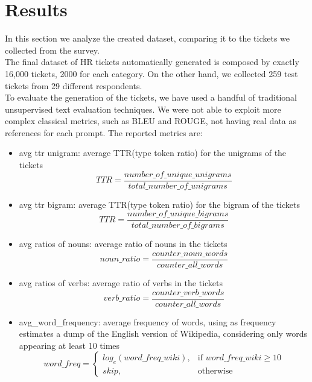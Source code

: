 \section{Results}
In this section we analyze the created dataset, comparing it to the tickets we collected from the survey. \\
The final dataset of HR tickets automatically generated is composed by exactly 16,000 tickets, 2000 for each category. On the other hand, we collected 259 test tickets from 29 different respondents. \\
To evaluate the generation of the tickets, we have used a handful of traditional unsupervised text evaluation techniques. We were not able to exploit more complex classical metrics, such as BLEU and ROUGE, not having real data as references for each prompt.
The reported metrics are:
\begin{itemize}
    \item avg ttr unigram: average TTR(type token ratio) for the unigrams of the tickets\\ 
    \begin{equation*}
        TTR = \frac{number\_of\_unique\_unigrams}{total\_number\_of\_unigrams}
    \end{equation*}
    \item avg ttr bigram: average TTR(type token ratio) for the bigram of the tickets\\ 
    \begin{equation*}
        TTR = \frac{number\_of\_unique\_bigrams}{total\_number\_of\_bigrams}
    \end{equation*}
    \item avg ratios of nouns: average ratio of nouns in the tickets\\
    \begin{equation*}
        noun\_ratio = \frac{counter\_noun\_words}{counter\_all\_words}
    \end{equation*}
    \item avg ratios of verbs: average ratio of verbs in the tickets\\
    \begin{equation*}
        verb\_ratio = \frac{counter\_verb\_words}{counter\_all\_words}
    \end{equation*}
    \item avg\_word\_frequency: average frequency of words, using as frequency estimates a dump of the English version of Wikipedia, considering only words appearing at least 10 times\\
    \begin{equation*}
        word\_freq= 
        \begin{cases}
            log_{e}(word\_freq\_wiki),& \text{if } word\_freq\_wiki\geq 10\\
            skip,                   & \text{otherwise}
        \end{cases}
    \end{equation*}
\end{itemize}
